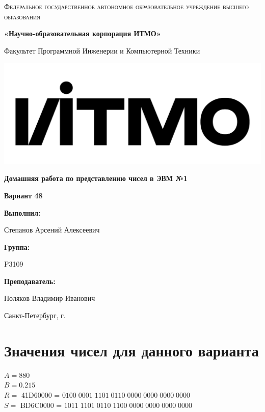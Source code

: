 \documentclass[12pt,a4paper]{report}
\begin{document}
\begin{titlepage}
	\centering
	{
        \scshape
        Федеральное государственное автономное образовательное учреждение высшего образования
        \par
        \textbf{«Научно-образовательная корпорация ИТМО»}
        \par
        \vspace*{1cm}
        Факультет Программной Инженерии и Компьютерной Техники
        \par
    }
    \vspace*{0.6cm}
    \includegraphics[width=\textwidth]{logo.png}
    {
        \Large
        \textbf{Домашняя работа по представлению чисел в ЭВМ №1}
        \par
        \normalsize
        \vspace*{0.75cm}
        \textbf{Вариант 48}
        \par
    }
    \vfill
    \hfill\begin{minipage}{\dimexpr\textwidth-7.8cm}
        \textbf{Выполнил:}\par
        Степанов Арсений Алексеевич\par
        \vspace*{0.15cm}
        \textbf{Группа:}\par
        P3109\par
        \vspace*{0.15cm}
        \textbf{Преподаватель:}\par
        Поляков Владимир Иванович\par
    \end{minipage}
    \vfill
    Санкт-Петербург, \the\year{}г.
\end{titlepage}
\section*{Значения чисел для данного варианта}
\onehalfspacing
$A=880$\\
$B=0.215$\\
$R=$ 41D60000 = $0100\;0001\;1101\;0110\;0000\;0000\;0000\;0000$\\
$S=$ BD6C0000 = $1011\;1101\;0110\;1100\;0000\;0000\;0000\;0000$
\end{document}
